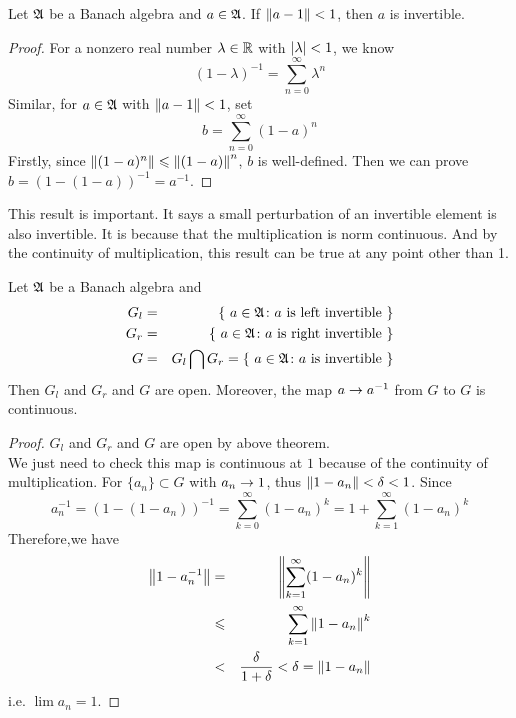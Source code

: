 \documentclass[a4paper,11pt]{report}
\begin{document}
\begin{thm}
	Let $\mathfrak{A}$ be a Banach algebra and $a \in \mathfrak{A}$. If $\left\lVert a-1\right\lVert < 1$, then $a$ is invertible.
\end{thm}
\begin{proof}
	For a nonzero real number $\lambda \in \mathbb{R}$ with $\left\lvert\lambda\right\lvert < 1$, we know 
	\begin{equation*}
		(1-\lambda)^{-1} = \sum_{n=0}^{\infty} \lambda^{n}
	\end{equation*}
	Similar, for $a \in \mathfrak{A}$ with $\left\lVert a-1\right\lVert < 1$, set
	\begin{equation*}
		b= \sum_{n=0}^{\infty} (1-a)^{n}
	\end{equation*}
	Firstly, since $\left\lVert(1-a)^{n}\right\lVert \leqslant \left\lVert(1-a)\right\lVert^{n}$, $b$ is well-defined. Then we can prove $b = (1-(1-a))^{-1} = a^{-1}$.
\end{proof}
\begin{rem}
	This result is important. It says a small perturbation of an invertible element is also invertible. It is because that the multiplication is norm continuous. And by the continuity of multiplication, this result can be true at any point other than 1.
\end{rem}

\begin{cor}
	Let $\mathfrak{A}$ be a Banach algebra and 
	\begin{eqnarray*}
		G_l &=& \{~a \in \mathfrak{A} \colon a \text{ is left invertible}~\}\\
		G_r &=& \{~a \in \mathfrak{A} \colon a \text{ is right invertible}~\}\\
		G &=& G_l \bigcap G_r = \{~a \in \mathfrak{A} \colon a \text{ is invertible}~\}
	\end{eqnarray*}
	Then $G_l$ and $G_r$ and $G$ are open. Moreover, the map $a \rightarrow a^{-1}$ from $G$ to $G$ is continuous.
\end{cor}
\begin{proof}
	$G_l$ and $G_r$ and $G$ are open by above theorem. \\
	We just need to check this map is continuous at $1$ because of the continuity of multiplication. For $\{a_n\} \subset G$ with $a_n \rightarrow 1$, thus $\left\lVert1-a_n\right\lVert<\delta<1$. Since
	\begin{equation*}
		a_n^{-1} = (1-(1-a_n))^{-1} = \sum_{k=0}^{\infty} (1-a_n)^{k} = 1+ \sum_{k=1}^{\infty} (1-a_n)^{k}
	\end{equation*}
	Therefore,we have
	\begin{eqnarray*}
		\left\lVert1-a_n^{-1}\right\lVert &=& \left\lVert\sum_{k=1}^{\infty} (1-a_n)^{k}\right\lVert\\
		&\leqslant&  \sum_{k=1}^{\infty} \left\lVert1-a_n\right\lVert^{k}\\
		&<& \frac{\delta}{1+\delta} < \delta = \left\lVert1-a_n\right\lVert
	\end{eqnarray*}
	i.e. $\lim a_n = 1$.
\end{proof}
\end{document}
